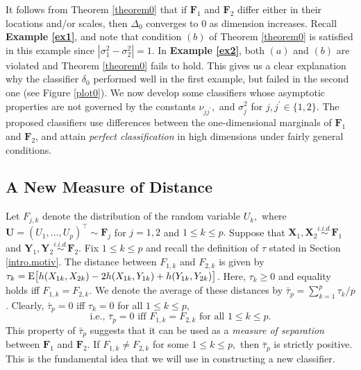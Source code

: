 \documentclass[twoside]{article}
\newcommand{\bX}{\mathbf{X}}
\newcommand{\bY}{\mathbf{Y}}
\newcommand{\bZ}{\mathbf{Z}}
\newcommand{\bF}{\mathbf{F}}
\newcommand{\bU}{\mathbf{U}}
\newcommand{\0}{\mathbf{0}}
\newcommand{\1}{\mathbf{1}}
\numberwithin{equation}{section}
\begin{document}
It follows from Theorem \ref{theorem0} that if $\bF_1$ and $\bF_2$ differ either in their locations and/or scales, then $\Delta_0$ converges to 0 as dimension increases. Recall {\bf Example \ref{ex1}}, and note that condition $(b)$ of Theorem \ref{theorem0} is satisfied  in this example since $|\sigma^2_1-\sigma^2_2|=1$. In {\bf Example \ref{ex2}}, both $(a)$ and  $(b)$ are violated and  Theorem \ref{theorem0} fails to hold. This gives us a clear explanation why the classifier $\delta_0$ performed well in the first example, but failed in the second one (see Figure \ref{plot0}). We now develop some classifiers whose asymptotic properties are not governed by the constants $\nu_{jj^\prime},$ and $ \sigma^2_j$ for $j,j^\prime\in\{1,2\}.$ The proposed classifiers use differences between the one-dimensional marginals of $\bF_1$ and $\bF_2$, and attain {\it perfect classification} in high dimensions under fairly general conditions.

\subsection{A New Measure of Distance}\label{AoDist}
Let $F_{j,k}$ denote the distribution of the random variable $U_k,$ where $\bU=(U_1,\ldots, U_{p})^\top\sim\bF_j$ for $j=1,2$ and $1\le k\le p.$
Suppose that $\bX_1,\bX_2\stackrel{i.i.d.}{\sim}\bF_1$ and $\bY_1,\bY_2\stackrel{i.i.d.}{\sim}\bF_2$. Fix $1\le k\le p$ and recall the definition of $\tau$ stated in Section \ref{intro.motiv}. The distance between $F_{1,k}$ and $F_{2,k}$ is given by $\tau_k = {\rm E}\big [ h(X_{1k},X_{2k})-2 h(X_{1k},Y_{1k})+ h(Y_{1k},Y_{2k})\big ]$. Here, $\tau_k\geq 0$ and equality holds iff $F_{1,k}=F_{2,k}.$ We denote the average of these distances by $\bar{\tau}_p=\sum_{k=1}^{p}\tau_k/p$. Clearly,
$\bar{\tau}_p=0$ iff $\tau_k=0$ for all $1\le k\le p$,
$$\text{i.e., }\bar{\tau}_p=0\text{ iff }F_{1,k}=F_{2,k}\text{ for all }1\le k\le p.$$
This property of $\bar{\tau}_p$ suggests that it can be used as a {\it measure of separation} between $\bF_1$ and $\bF_2$. If $F_{1,k}\neq F_{2,k}$ for some $1\le k\le p,$  then $\bar{\tau}_p$ is strictly positive. This is the fundamental idea that we will use in constructing a new classifier.
\end{document}
